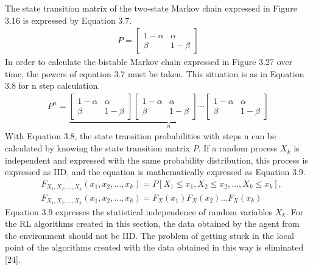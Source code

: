 \documentclass[12pt,twoside,a4]{mwbk}
\begin{document}
\noindent The state transition matrix of the two-state Markov chain expressed in Figure 3.16 is expressed by Equation 3.7.
\begin{subequations}
\begin{align}
        P=\left[\begin{array}{cc}
        1-\alpha & \alpha \\
        \beta & 1-\beta
        \end{array}\right]
\end{align}
\end{subequations}
In order to calculate the bistable Markov chain expressed in Figure 3.27 over time, the powers of equation 3.7 must be taken. This situation is as in Equation 3.8 for n step calculation.
\begin{subequations}
\begin{align}
        P^{n}=\underbrace{\left[\begin{array}{cc}
        1-\alpha & \alpha \\
        \beta & 1-\beta
        \end{array}\right]\left[\begin{array}{cc}
        1-\alpha & \alpha \\
        \beta & 1-\beta
        \end{array}\right] \cdots\left[\begin{array}{cc}
        1-\alpha & \alpha \\
        \beta & 1-\beta
        \end{array}\right]}_{n}
\end{align}
\end{subequations}
With Equation 3.8, the state transition probabilities with steps $\mathrm{n}$ can be calculated by knowing the state transition matrix $P$. If a random process $X_{k}$ is independent and expressed with the same probability distribution, this process is expressed as IID, and the equation is mathematically expressed as Equation 3.9.
\begin{subequations}
\begin{align}
        &F_{X_{1}, X_{2}, \ldots, X_{k}}\left(x_{1}, x_{2}, \ldots, x_{k}\right)=P\left[X_{1} \leq x_{1}, X_{2} \leq x_{2}, \ldots, X_{k} \leq x_{k}\right], \\
        &F_{X_{1}, X_{2}, \ldots, X_{k}}\left(x_{1}, x_{2}, \ldots, x_{k}\right)=F_{X}\left(x_{1}\right) F_{X}\left(x_{2}\right) \ldots F_{X}\left(x_{k}\right)
\end{align}
\end{subequations}
Equation 3.9 expresses the statistical independence of random variables $X_{k}$. For the RL algorithms created in this section, the data obtained by the agent from the environment should not be IID. The problem of getting stuck in the local point of the algorithms created with the data obtained in this way is eliminated [24].
\end{document}

